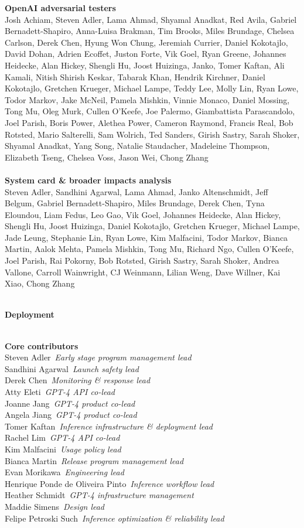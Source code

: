 \documentclass{article}
\newcommand{\creditsectionheader}[1]{\parbox{\columnwidth}{\centering \textbf{\small #1}}\\}
\newcommand{\creditlistheader}[1]{\textbf{#1}\footnotemark[\thefootnote]\\}
\newcommand{\creditlist}[2]{\creditlistheader{#1}#2\\
\\}
\newcommand{\corecontributor}[2]{#1\ \textit{#2}\\}
\begin{document}
\begin{multicols}{2}
\creditlist{OpenAI adversarial testers}{Josh Achiam, Steven Adler, Lama Ahmad, Shyamal Anadkat, Red Avila, Gabriel Bernadett-Shapiro, Anna-Luisa Brakman, Tim Brooks, Miles Brundage, Chelsea Carlson, Derek Chen, Hyung Won Chung, Jeremiah Currier, Daniel Kokotajlo, David Dohan, Adrien Ecoffet, Juston Forte, Vik Goel, Ryan Greene, Johannes Heidecke, Alan Hickey, Shengli Hu, Joost Huizinga, Janko, Tomer Kaftan, Ali Kamali, Nitish Shirish Keskar, Tabarak Khan, Hendrik Kirchner, Daniel Kokotajlo, Gretchen Krueger, Michael Lampe, Teddy Lee, Molly Lin, Ryan Lowe, Todor Markov, Jake McNeil, Pamela Mishkin, Vinnie Monaco, Daniel Mossing, Tong Mu, Oleg Murk, Cullen O'Keefe, Joe Palermo, Giambattista Parascandolo, Joel Parish, Boris Power, Alethea Power, Cameron Raymond, Francis Real, Bob Rotsted, Mario Salterelli, Sam Wolrich, Ted Sanders, Girish Sastry, Sarah Shoker, Shyamal Anadkat, Yang Song, Natalie Staudacher, Madeleine Thompson, Elizabeth Tseng, Chelsea Voss, Jason Wei, Chong Zhang}
\creditlist{System card \& broader impacts analysis}{Steven Adler, Sandhini Agarwal, Lama Ahmad, Janko Altenschmidt, Jeff Belgum, Gabriel Bernadett-Shapiro, Miles Brundage, Derek Chen, Tyna Eloundou, Liam Fedus, Leo Gao, Vik Goel, Johannes Heidecke, Alan Hickey, Shengli Hu, Joost Huizinga, Daniel Kokotajlo, Gretchen Krueger, Michael Lampe, Jade Leung, Stephanie Lin, Ryan Lowe, Kim Malfacini, Todor Markov, Bianca Martin, Aalok Mehta, Pamela Mishkin, Tong Mu, Richard Ngo, Cullen O'Keefe, Joel Parish, Rai Pokorny, Bob Rotsted, Girish Sastry, Sarah Shoker, Andrea Vallone, Carroll Wainwright, CJ Weinmann, Lilian Weng, Dave Willner, Kai Xiao, Chong Zhang}
\creditsectionheader{Deployment}
\creditlistheader{Core contributors}
\corecontributor{Steven Adler}{Early stage program management lead}
\corecontributor{Sandhini Agarwal}{Launch safety lead}
\corecontributor{Derek Chen}{Monitoring \& response lead}
\corecontributor{Atty Eleti}{GPT-4 API co-lead}
\corecontributor{Joanne Jang}{GPT-4 product co-lead}
\corecontributor{Angela Jiang}{GPT-4 product co-lead}
\corecontributor{Tomer Kaftan}{Inference infrastructure \& deployment lead}
\corecontributor{Rachel Lim}{GPT-4 API co-lead}
\corecontributor{Kim Malfacini}{Usage policy lead}
\corecontributor{Bianca Martin}{Release program management lead}
\corecontributor{Evan Morikawa}{Engineering lead}
\corecontributor{Henrique Ponde de Oliveira Pinto}{Inference workflow lead}
\corecontributor{Heather Schmidt}{GPT-4 infrastructure management}
\corecontributor{Maddie Simens}{Design lead}
\corecontributor{Felipe Petroski Such}{Inference optimization \& reliability lead}

\end{multicols}
\end{document}
